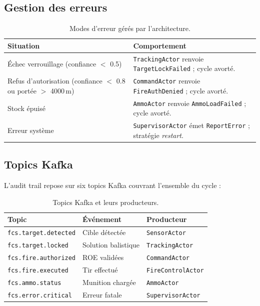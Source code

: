 \documentclass[11pt,a4paper]{article}
\newcommand{\code}[1]{\texttt{#1}}
\begin{document}
\subsection{Gestion des erreurs}

\begin{table}[H]
\centering\small
\begin{tabularx}{\linewidth}{l X}
\toprule
\rowcolor{tableheader}\textbf{Situation} & \textbf{Comportement} \\
\midrule
Échec verrouillage (confiance $<$ 0.5)
& \code{TrackingActor} renvoie \code{TargetLockFailed} ; cycle avorté. \\
Refus d'autorisation (confiance $<$ 0.8 ou portée $>$ 4000\,m)
& \code{CommandActor} renvoie \code{FireAuthDenied} ; cycle avorté. \\
Stock épuisé
& \code{AmmoActor} renvoie \code{AmmoLoadFailed} ; cycle avorté. \\
Erreur système
& \code{SupervisorActor} émet \code{ReportError} ; stratégie \emph{restart}. \\
\bottomrule
\end{tabularx}
\caption{Modes d'erreur gérés par l'architecture.}
\end{table}

\subsection{Topics Kafka}

L'audit trail repose sur six topics Kafka couvrant l'ensemble du cycle :

\begin{table}[H]
\centering\small
\begin{tabular}{l l l}
\toprule
\rowcolor{tableheader}\textbf{Topic} & \textbf{Événement} & \textbf{Producteur} \\
\midrule
\code{fcs.target.detected}  & Cible détectée       & \code{SensorActor} \\
\code{fcs.target.locked}    & Solution balistique  & \code{TrackingActor} \\
\code{fcs.fire.authorized}  & ROE validées         & \code{CommandActor} \\
\code{fcs.fire.executed}    & Tir effectué         & \code{FireControlActor} \\
\code{fcs.ammo.status}      & Munition chargée     & \code{AmmoActor} \\
\code{fcs.error.critical}   & Erreur fatale        & \code{SupervisorActor} \\
\bottomrule
\end{tabular}
\caption{Topics Kafka et leurs producteurs.}
\end{table}
\end{document}
